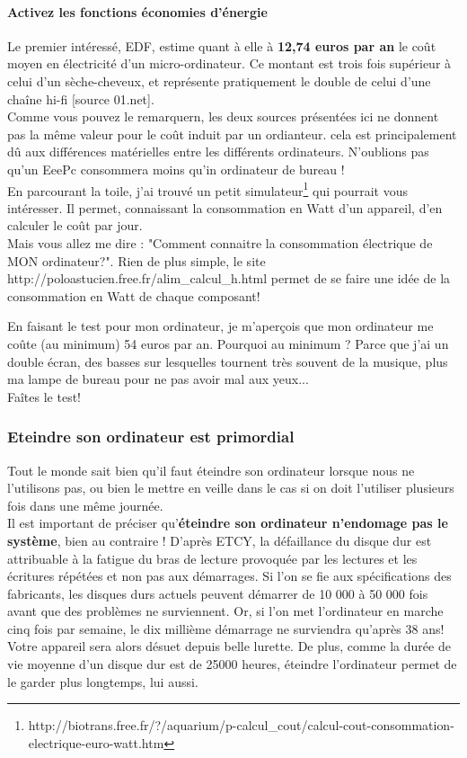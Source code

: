 \documentclass[a4paper,11pt,french]{article}
\begin{document}
\paragraph{Activez les fonctions \og économies d’énergie \fg}
Le premier intéressé, EDF, estime quant à elle à \textbf{12,74 euros par an} le coût moyen en électricité d'un micro-ordinateur. Ce montant est trois fois supérieur à celui d'un sèche-cheveux, et représente pratiquement le double de celui d'une chaîne hi-fi [source 01.net].\\

Comme vous pouvez le remarquern, les deux sources présentées ici ne donnent pas la même valeur pour le coût induit par un ordianteur. cela est principalement dû aux différences matérielles entre les différents ordinateurs. N'oublions pas qu'un EeePc consommera moins qu'in ordinateur de bureau !\\

En parcourant la toile, j'ai trouvé un petit simulateur\footnote{\textsf{http://biotrans.free.fr/?/aquarium/p-calcul\_{}cout/calcul-cout-consommation-electrique-euro-watt.htm}} qui pourrait vous intéresser. Il permet, connaissant la consommation en Watt d'un appareil, d'en calculer le coût par jour.\\

Mais vous allez me dire : "Comment connaitre la consommation électrique de MON ordinateur?". Rien de plus simple, le site \textsf{http://poloastucien.free.fr/alim\_{}calcul\_{}h.html} permet de se faire une idée de la consommation en Watt de chaque composant!

En faisant le test pour mon ordinateur, je m'aperçois que mon ordinateur me coûte (au minimum) 54 euros par an. Pourquoi au minimum ? Parce que j'ai un double écran, des basses sur lesquelles tournent très souvent de la musique, plus ma lampe de bureau pour ne pas avoir mal aux yeux...\\

Faîtes le test!

\subsubsection{Eteindre son ordinateur est primordial}
Tout le monde sait bien qu'il faut éteindre son ordinateur lorsque nous ne l'utilisons pas, ou bien le mettre en veille dans le cas si on doit l'utiliser plusieurs fois dans une même journée.\\
Il est important de préciser qu'\textbf{éteindre son ordinateur n'endomage pas le système}, bien au contraire ! D'après ETCY, la défaillance du disque dur est attribuable à la fatigue du bras de lecture provoquée par les lectures et les écritures répétées et non pas aux démarrages. Si l'on se fie aux spécifications des fabricants, les disques durs actuels peuvent démarrer de 10 000 à 50 000 fois avant que des problèmes ne surviennent. Or, si l'on met l'ordinateur en marche cinq fois par semaine, le dix millième démarrage ne surviendra qu'après 38 ans! Votre appareil sera alors désuet depuis belle lurette. De plus, comme la durée de vie moyenne d'un disque dur est de 25000 heures, éteindre l'ordinateur permet de le garder plus longtemps, lui aussi.\\
\end{document}
